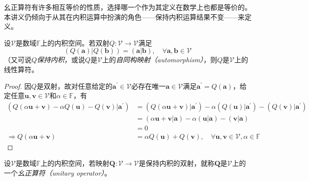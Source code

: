 \documentclass[main.tex]{subfiles}
\begin{document}
幺正算符有许多相互等价的性质，选择哪一个作为其定义在数学上也都是等价的。本讲义仍倾向于从其在内积运算中扮演的角色——保持内积运算结果不变——来定义。

\begin{lemma}\label{lem:II.2.2}
    设$\mathcal{V}$是数域$\mathbb{F}$上的内积空间。若双射$Q:\mathcal{V}\rightarrow\mathcal{V}$满足
    \[\left(Q\left(\mathbf{a}\right)|Q\left(\mathbf{b}\right)\right)=\left(\mathbf{a}|\mathbf{b}\right),\quad\forall\mathbf{a},\mathbf{b}\in\mathcal{V}\]
    （又可说$Q$\emph{保持内积}，或说$Q$是$\mathcal{V}$上的\emph{自同构映射（automorphism）}，则$Q$是$\mathcal{V}$上的线性算符。
\end{lemma}
\begin{proof}
    因$Q$是双射，故对任意给定的$\mathbf{a}^\prime\in\mathcal{V}$必存在唯一$\mathbf{a}\in\mathcal{V}$满足$\mathbf{a}^\prime=Q\left(\mathbf{a}\right)$，给定任意$\mathbf{u},\mathbf{v}\in\mathcal{V}$和$\alpha\in\mathbb{F}$，有
    \begin{align*}
        \left(Q\left(\alpha\mathbf{u}+\mathbf{v}\right)-\alpha Q\left(\mathbf{u}\right)-Q\left(\mathbf{v}\right)|\mathbf{a}^\prime\right) & =\left(Q\left(\alpha\mathbf{u}+\mathbf{v}\right)|\mathbf{a}^\prime\right)-\alpha\left(Q\left(\mathbf{u}\right)|\mathbf{a}^\prime\right)-\left(Q\left(\mathbf{v}\right)|\mathbf{a}^\prime\right) \\
                                                                                                                                          & =\left(\alpha\mathbf{u}+\mathbf{v}|\mathbf{a}\right)-\alpha\left(\mathbf{u}|\mathbf{a}\right)-\left(\mathbf{v}|\mathbf{a}\right)                                                                \\
                                                                                                                                          & =0                                                                                                                                                                                              \\
        \Rightarrow Q\left(\alpha\mathbf{u}+\mathbf{v}\right)                                                                             & =\alpha Q\left(\mathbf{u}\right)+Q\left(\mathbf{v}\right),\quad\forall\mathbf{u},\mathbf{v}\in\mathcal{V},\alpha\in\mathbb{F}
    \end{align*}
\end{proof}

\begin{definition}[幺正算符]\label{def:II.2.23}
    设$\mathcal{V}$是数域$\mathbb{F}$上的内积空间，若映射$\mathbf{Q}:\mathcal{V}\rightarrow\mathcal{V}$是保持内积的双射，就称$\mathbf{Q}$是$\mathcal{V}$上的一个\emph{幺正算符（unitary operator）}。
\end{definition}
\end{document}
